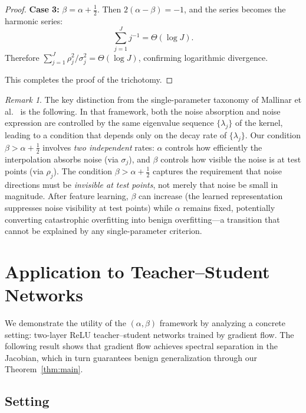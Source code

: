 \documentclass[12pt]{amsart}
\theoremstyle{definition}
\theoremstyle{remark}
\newtheorem{remark}[theorem]{Remark}
\begin{document}
\begin{proof}
\medskip
\noindent\textbf{Case 3:} $\beta = \alpha + \tfrac{1}{2}$.  Then
$2(\alpha - \beta) = -1$, and the series becomes the harmonic series:
\begin{equation}
  \sum_{j=1}^{J} j^{-1} = \Theta(\log J).
\end{equation}
Therefore $\sum_{j=1}^{J} \rho_{j}^{2}/\sigma_{j}^{2} = \Theta(\log J)$,
confirming logarithmic divergence.

This completes the proof of the trichotomy.
\end{proof}

\begin{remark}\label{rem:two-vs-one}
The key distinction from the single-parameter taxonomy of
Mallinar et al.~\cite{MSCBR2022} is the following.  In that framework, both the
noise absorption and noise expression are controlled by the same eigenvalue
sequence $\{\lambda_{j}\}$ of the kernel, leading to a condition that depends
only on the decay rate of $\{\lambda_{j}\}$.  Our condition
$\beta > \alpha + \tfrac{1}{2}$ involves \emph{two independent} rates: $\alpha$
controls how efficiently the interpolation absorbs noise (via $\sigma_{j}$), and
$\beta$ controls how visible the noise is at test points (via $\rho_{j}$).  The
condition $\beta > \alpha + \tfrac{1}{2}$ captures the requirement that noise
directions must be \emph{invisible at test points}, not merely that noise be
small in magnitude.  After feature learning, $\beta$ can increase (the learned
representation suppresses noise visibility at test points) while $\alpha$
remains fixed, potentially converting catastrophic overfitting into benign
overfitting---a transition that cannot be explained by any single-parameter
criterion.
\end{remark}

\section{Application to Teacher--Student Networks}\label{sec:app}

We demonstrate the utility of the $(\alpha, \beta)$ framework by analyzing a
concrete setting: two-layer ReLU teacher--student networks trained by gradient
flow.  The following result shows that gradient flow achieves spectral separation
in the Jacobian, which in turn guarantees benign generalization through our
Theorem~\ref{thm:main}.

\subsection{Setting}
\end{document}
